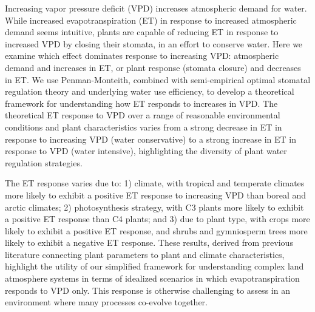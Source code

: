 Increasing vapor pressure deficit (VPD) increases atmospheric demand
for water. While increased evapotranspiration (ET) in response to
increased atmospheric demand seems intuitive, plants are capable of
reducing ET in response to increased VPD by closing their stomata, in
an effort to conserve water. Here we examine which effect dominates
response to increasing VPD: atmospheric demand and increases in ET, or
plant response (stomata closure) and decreases in ET. We use
Penman-Monteith, combined with semi-empirical optimal stomatal
regulation theory and underlying water use efficiency, to develop a
theoretical framework for understanding how ET responds to increases
in VPD. The theoretical ET response to VPD over a range of reasonable
environmental conditions and plant characteristics varies from a
strong decrease in ET in response to increasing VPD (water
conservative) to a strong increase in ET in response to VPD (water
intensive), highlighting the diversity of plant water regulation
strategies.

The ET response varies due to: 1) climate, with tropical and temperate
climates more likely to exhibit a positive ET response to increasing
VPD than boreal and arctic climates; 2) photosynthesis strategy, with
C3 plants more likely to exhibit a positive ET response than C4
plants; and 3) due to plant type, with crops more likely to exhibit a
positive ET response, and shrubs and gymniosperm trees more likely to
exhibit a negative ET response. These results, derived from previous
literature connecting plant parameters to plant and climate
characteristics, highlight the utility of our simplified framework for
understanding complex land atmosphere systems in terms of idealized
scenarios in which evapotranspiration responds to VPD only. This
response is otherwise challenging to assess in an environment where
many processes co-evolve together.